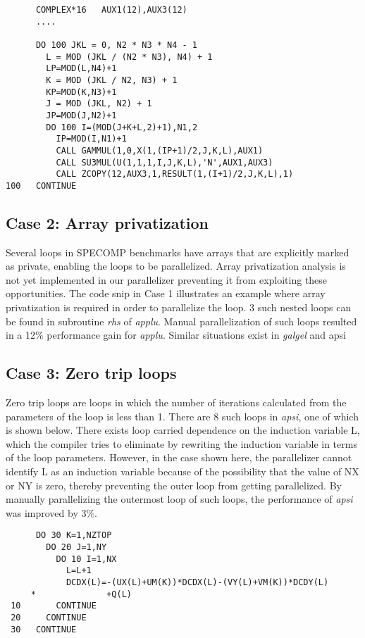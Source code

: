 {\small
\begin{verbatim}
      COMPLEX*16   AUX1(12),AUX3(12)
      ....
      
      DO 100 JKL = 0, N2 * N3 * N4 - 1
        L = MOD (JKL / (N2 * N3), N4) + 1
        LP=MOD(L,N4)+1
        K = MOD (JKL / N2, N3) + 1
        KP=MOD(K,N3)+1
        J = MOD (JKL, N2) + 1
        JP=MOD(J,N2)+1
        DO 100 I=(MOD(J+K+L,2)+1),N1,2
          IP=MOD(I,N1)+1
          CALL GAMMUL(1,0,X(1,(IP+1)/2,J,K,L),AUX1)
          CALL SU3MUL(U(1,1,1,I,J,K,L),'N',AUX1,AUX3)
          CALL ZCOPY(12,AUX3,1,RESULT(1,(I+1)/2,J,K,L),1)
100   CONTINUE
\end{verbatim}
}

\subsection {Case 2: Array privatization}

Several loops in SPECOMP benchmarks have arrays that are explicitly marked as private, enabling the loops to be parallelized. Array privatization analysis is not yet implemented in our parallelizer preventing it from exploiting these opportunities. The code snip in Case 1 illustrates an example where array privatization is required in order to parallelize the loop. 3 such nested loops can be found in subroutine \emph{rhs} of \emph{applu}. Manual parallelization of such loops resulted in a 12\% performance gain for \emph{applu}. Similar situations exist in \emph{galgel} and {apsi}

\subsection{Case 3: Zero trip loops}

Zero trip loops are loops in which the number of iterations calculated
from the parameters of the loop is less than 1. There are 8 such
loops in \emph{apsi}, one of which is shown below. There exists loop carried dependence on the induction variable L, which the compiler tries to eliminate by rewriting the induction variable in terms of the loop parameters. However, in the case shown here, the parallelizer cannot identify L as an induction variable because of the possibility that the value of NX or NY is zero, thereby preventing the outer loop from getting parallelized. By manually parallelizing the outermost
loop of such loops, the performance of \emph{apsi} was improved by 3\%.

{\small
\begin{verbatim}
      DO 30 K=1,NZTOP
        DO 20 J=1,NY
          DO 10 I=1,NX
            L=L+1
            DCDX(L)=-(UX(L)+UM(K))*DCDX(L)-(VY(L)+VM(K))*DCDY(L)
     *              +Q(L)
 10       CONTINUE
 20     CONTINUE
 30   CONTINUE
\end{verbatim}
}

